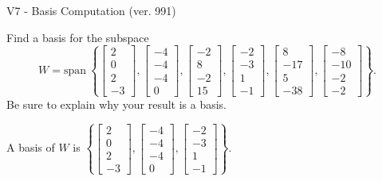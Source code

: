 \begin{exercise}
  \begin{exerciseTitle}V7 - Basis Computation (ver. 991)\end{exerciseTitle}
  \begin{exerciseStatement}
    Find a basis for the subspace 
\[W=\mathrm{span}\ \left\{\left[\begin{array}{r}
2 \\
0 \\
2 \\
-3
\end{array}\right] , \left[\begin{array}{r}
-4 \\
-4 \\
-4 \\
0
\end{array}\right] , \left[\begin{array}{r}
-2 \\
8 \\
-2 \\
15
\end{array}\right] , \left[\begin{array}{r}
-2 \\
-3 \\
1 \\
-1
\end{array}\right] , \left[\begin{array}{r}
8 \\
-17 \\
5 \\
-38
\end{array}\right] , \left[\begin{array}{r}
-8 \\
-10 \\
-2 \\
-2
\end{array}\right]\right\}.\]
 Be sure to explain why your result is a basis.


  \end{exerciseStatement}
  \begin{exerciseAnswer}
   A basis of \(W\) is  \(\left\{\left[\begin{array}{r}
2 \\
0 \\
2 \\
-3
\end{array}\right] , \left[\begin{array}{r}
-4 \\
-4 \\
-4 \\
0
\end{array}\right] , \left[\begin{array}{r}
-2 \\
-3 \\
1 \\
-1
\end{array}\right]\right\}\).
  


  \end{exerciseAnswer}
\end{exercise}
